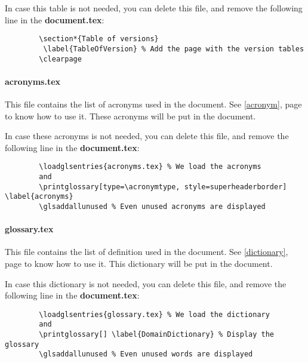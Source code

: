 In case this table is not needed, you can delete this file, and remove the following line in the
\textbf{document.tex}:
\begin{code}
    \begin{verbatim}
        \section*{Table of versions}
         \label{TableOfVersion} % Add the page with the version tables
        \clearpage
    \end{verbatim}
    \caption{Delete versions table}
\end{code}

\paragraph{acronyms.tex}
This file contains the list of acronyms used in the document. See \ref{acronym}, page
\pageref{acronym} to know how to use it.
These acronyms will be put in the document.\newline

In case these acronyms is not needed, you can delete this file, and remove the following line in the
\textbf{document.tex}:
\begin{code}
    \begin{verbatim}
        \loadglsentries{acronyms.tex} % We load the acronyms
        and
        \printglossary[type=\acronymtype, style=superheaderborder] \label{acronyms}
        \glsaddallunused % Even unused acronyms are displayed
    \end{verbatim}
    \caption{Delete acronyms}
\end{code}

\paragraph{glossary.tex}
This file contains the list of definition used in the document. See \ref{dictionary}, page
\pageref{dictionary} to know how to use it.
This dictionary will be put in the document.\newline

In case this dictionary is not needed, you can delete this file, and remove the following line in
the \textbf{document.tex}:
\begin{code}
    \begin{verbatim}
        \loadglsentries{glossary.tex} % We load the dictionary
        and
        \printglossary[] \label{DomainDictionary} % Display the glossary
        \glsaddallunused % Even unused words are displayed
    \end{verbatim}
    \caption{Delete dictionary}
\end{code}

